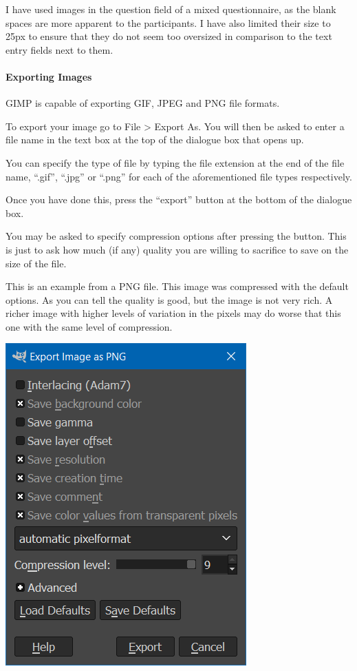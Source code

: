 \documentclass[]{book}
\let\oldparagraph\paragraph
\renewcommand{\paragraph}[1]{\oldparagraph{#1}\mbox{}}
\begin{document}
I have used images in the question field of a mixed questionnaire, as the blank spaces are more apparent to the participants. I have also limited their size to 25px to ensure that they do not seem too oversized in comparison to the text entry fields next to them.

\hypertarget{exporting-images}{%
\paragraph{Exporting Images}\label{exporting-images}}

GIMP is capable of exporting GIF, JPEG and PNG file formats.

To export your image go to File \textgreater{} Export As. You will then be asked to enter a file name in the text box at the top of the dialogue box that opens up.

You can specify the type of file by typing the file extension at the end of the file name, ``.gif'', ``.jpg'' or ``.png'' for each of the aforementioned file types respectively.

Once you have done this, press the ``export'' button at the bottom of the dialogue box.

You may be asked to specify compression options after pressing the button. This is just to ask how much (if any) quality you are willing to sacrifice to save on the size of the file.

This is an example from a PNG file. This image was compressed with the default options. As you can tell the quality is good, but the image is not very rich. A richer image with higher levels of variation in the pixels may do worse that this one with the same level of compression.

\includegraphics{images/screenshots/export_1.png}
\end{document}
